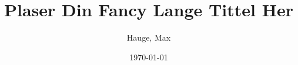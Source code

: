 
\author{Hauge, Max}


\newif\ifSINGLESUPERVISOR
\SINGLESUPERVISORfalse  %

\ifSINGLESUPERVISOR
    \newcommand{\supervisorGrammar}{Supervisor}
    \newcommand{\supervisor_A}{Grepstad, Sigrid}
\else
    \newcommand{\supervisorGrammar}{Supervisors}
    \newcommand{\supervisorA}{Grepstad, Sigrid}
    \newcommand{\supervisorB}{Heap, Winston}  %
\fi


\title{Plaser Din Fancy Lange Tittel Her}


\newcommand{\emnekode}{MA3911 — masteroppgave i matematiske fag}


\renewcommand{\NTNUinstitutt}{Institute of Mathematical Sciences}
\renewcommand{\NTNUinstituttLowerC}{institute of mathematical sciences}


\date{\today}
